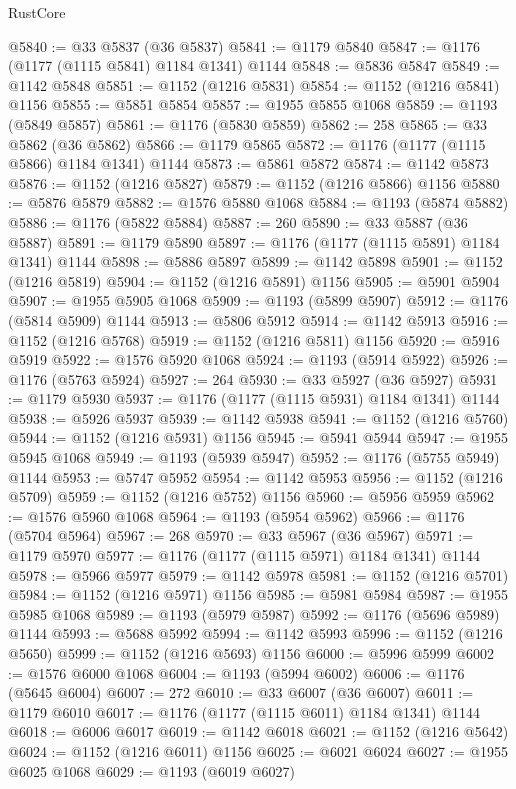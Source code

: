 \begin{lexlean}{RustCore}
\begin{coremodule}
@5840 := @33 @5837 (@36 @5837)
@5841 := @1179 @5840
@5847 := @1176 (@1177 (@1115 @5841) @1184 @1341) @1144
@5848 := @5836 @5847
@5849 := @1142 @5848
@5851 := @1152 (@1216 @5831)
@5854 := @1152 (@1216 @5841) @1156
@5855 := @5851 @5854
@5857 := @1955 @5855 @1068
@5859 := @1193 (@5849 @5857)
@5861 := @1176 (@5830 @5859)
@5862 := 258
@5865 := @33 @5862 (@36 @5862)
@5866 := @1179 @5865
@5872 := @1176 (@1177 (@1115 @5866) @1184 @1341) @1144
@5873 := @5861 @5872
@5874 := @1142 @5873
@5876 := @1152 (@1216 @5827)
@5879 := @1152 (@1216 @5866) @1156
@5880 := @5876 @5879
@5882 := @1576 @5880 @1068
@5884 := @1193 (@5874 @5882)
@5886 := @1176 (@5822 @5884)
@5887 := 260
@5890 := @33 @5887 (@36 @5887)
@5891 := @1179 @5890
@5897 := @1176 (@1177 (@1115 @5891) @1184 @1341) @1144
@5898 := @5886 @5897
@5899 := @1142 @5898
@5901 := @1152 (@1216 @5819)
@5904 := @1152 (@1216 @5891) @1156
@5905 := @5901 @5904
@5907 := @1955 @5905 @1068
@5909 := @1193 (@5899 @5907)
@5912 := @1176 (@5814 @5909) @1144
@5913 := @5806 @5912
@5914 := @1142 @5913
@5916 := @1152 (@1216 @5768)
@5919 := @1152 (@1216 @5811) @1156
@5920 := @5916 @5919
@5922 := @1576 @5920 @1068
@5924 := @1193 (@5914 @5922)
@5926 := @1176 (@5763 @5924)
@5927 := 264
@5930 := @33 @5927 (@36 @5927)
@5931 := @1179 @5930
@5937 := @1176 (@1177 (@1115 @5931) @1184 @1341) @1144
@5938 := @5926 @5937
@5939 := @1142 @5938
@5941 := @1152 (@1216 @5760)
@5944 := @1152 (@1216 @5931) @1156
@5945 := @5941 @5944
@5947 := @1955 @5945 @1068
@5949 := @1193 (@5939 @5947)
@5952 := @1176 (@5755 @5949) @1144
@5953 := @5747 @5952
@5954 := @1142 @5953
@5956 := @1152 (@1216 @5709)
@5959 := @1152 (@1216 @5752) @1156
@5960 := @5956 @5959
@5962 := @1576 @5960 @1068
@5964 := @1193 (@5954 @5962)
@5966 := @1176 (@5704 @5964)
@5967 := 268
@5970 := @33 @5967 (@36 @5967)
@5971 := @1179 @5970
@5977 := @1176 (@1177 (@1115 @5971) @1184 @1341) @1144
@5978 := @5966 @5977
@5979 := @1142 @5978
@5981 := @1152 (@1216 @5701)
@5984 := @1152 (@1216 @5971) @1156
@5985 := @5981 @5984
@5987 := @1955 @5985 @1068
@5989 := @1193 (@5979 @5987)
@5992 := @1176 (@5696 @5989) @1144
@5993 := @5688 @5992
@5994 := @1142 @5993
@5996 := @1152 (@1216 @5650)
@5999 := @1152 (@1216 @5693) @1156
@6000 := @5996 @5999
@6002 := @1576 @6000 @1068
@6004 := @1193 (@5994 @6002)
@6006 := @1176 (@5645 @6004)
@6007 := 272
@6010 := @33 @6007 (@36 @6007)
@6011 := @1179 @6010
@6017 := @1176 (@1177 (@1115 @6011) @1184 @1341) @1144
@6018 := @6006 @6017
@6019 := @1142 @6018
@6021 := @1152 (@1216 @5642)
@6024 := @1152 (@1216 @6011) @1156
@6025 := @6021 @6024
@6027 := @1955 @6025 @1068
@6029 := @1193 (@6019 @6027)

\end{coremodule}
\end{lexlean}
